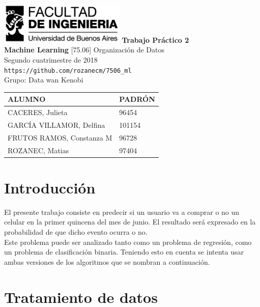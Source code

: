 \documentclass[a4paper]{article}
\begin{document}
\begin{titlepage} %
	\hfill\includegraphics[width=6cm]{logofiuba.jpg}
    \centering
    \vfill
    \Huge \textbf{Trabajo Práctico 2}\\
    \textbf{Machine Learning}
    \vskip2cm
    \Large [75.06] Organización de Datos\\
    Segundo cuatrimestre de 2018 \\
    \bigskip
    \faGithub{}\quad \texttt{https://github.com/rozanecm/7506\_ml}\\
    \bigskip
    \bigskip
    Grupo: Data wan Kenobi
    \vfill
    \begin{tabular}{ || l | l ||} %
      \hline
      
      ALUMNO & PADRÓN\\ [0.5ex]
      \hline \hline
      CACERES, Julieta & 96454\\
      \hline
      GARCÍA VILLAMOR, Delfina & 101154\\
      \hline
      FRUTOS RAMOS, Constanza M & 96728\\ 
      \hline
      ROZANEC, Matias & 97404\\
      \hline
  	\end{tabular}
    \vfill
    \vfill
\end{titlepage}

\tableofcontents %
\newpage

\section{Introducción}\label{sec:intro}

    El presente trabajo consiste en predecir si un usuario va a comprar o no un celular en la primer quincena del mes de junio.
    El resultado será expresado en la probabilidad de que dicho evento ocurra o no.\\
    Este problema puede ser analizado tanto como un problema de regresión, como un problema de clasificación binaria. Teniendo esto en cuenta se intenta usar ambas versiones de los algoritmos que se nombran a continuación.\\ 

\section{Tratamiento de datos}\label{sec:tratamiento}
\end{document}
